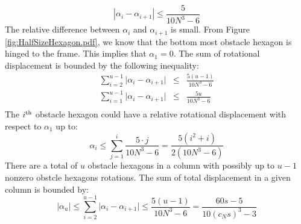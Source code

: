 \begin{equation}\label{eqn:angularBound}
\left\vert \alpha_i - \alpha_{i+1} \right\vert \leq \frac{5}{10N^3 -6}
\end{equation}
The relative difference between $\alpha_i$ and $\alpha_{i+1}$ is small.
From Figure \ref{fig:HalfSizeHexagon.pdf}, we know that the bottom most obstacle hexagon is hinged to the frame.  
This implies that $\alpha_1 = 0$. 
The sum of rotational displacement  is bounded by the following inequality:
\begin{equation}\label{eqn:angularSumBound}
\begin{array}{rcl}
\sum_{i=2}^{u-1} \vert \alpha_i - \alpha_{i+1} \vert &\leq& \frac{5(u-1)}{10N^3 -6}\\
\sum_{i=1}^{u-1} \vert \alpha_i - \alpha_{i+1} \vert &\leq& \frac{5u}{10N^3 -6}\\
\end{array}
\end{equation}
The $i^\text{th}$ obstacle hexagon could have a relative rotational displacement with respect to $\alpha_1$ up to:
$$\alpha_i \leq \sum_{j=1}^i\frac{5\cdot j}{10N^3-6}=\frac{5(i^2 + i)}{2(10N^3-6)}$$
There are a total of $u$ obstacle hexagons in a column with possibly up to $u-1$ nonzero obstcle hexagons rotations.
The sum of total displacement in a given column is bounded by:
$$ \vert \alpha_u \vert \leq \sum_{i=2}^{u-1} \vert \alpha_i - \alpha_{i+1} \vert \leq \frac{5(u-1)}{10N^3 -6} = \frac{60s - 5}{10 (c_N s)^3 - 3}$$